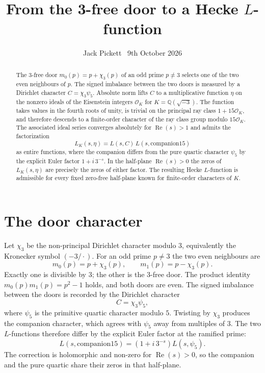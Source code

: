\documentclass[11pt,a4paper]{article}
\title{From the 3-free door to a Hecke $L$-function}
\author{Jack Pickett \textperiodcentered\ 9th October 2026}
\date{}
\begin{document}
\maketitle

\begin{abstract}
The 3-free door \(m_0(p)=p+\chi_3(p)\) of an odd prime \(p\neq 3\) selects one of the two even neighbours of \(p\). The signed imbalance between the two doors is measured by a Dirichlet character \(C=\chi_3\psi_5\). Absolute norm lifts \(C\) to a multiplicative function \(\eta\) on the nonzero ideals of the Eisenstein integers \(\mathcal{O}_K\) for \(K=\mathbb{Q}(\sqrt{-3})\). The function takes values in the fourth roots of unity, is trivial on the principal ray class \(1+15\mathcal{O}_K\), and therefore descends to a finite-order character of the ray class group modulo \(15\mathcal{O}_K\). The associated ideal series converges absolutely for \(\operatorname{Re}(s)>1\) and admits the factorization
\[
L_K(s,\eta)=L(s,C)\,L(s,\mathrm{companion15})
\]
as entire functions, where the companion differs from the pure quartic character \(\psi_5\) by the explicit Euler factor \(1+i\,3^{-s}\). In the half-plane \(\operatorname{Re}(s)>0\) the zeros of \(L_K(s,\eta)\) are precisely the zeros of either factor. The resulting Hecke \(L\)-function is admissible for every fixed zero-free half-plane known for finite-order characters of \(K\).
\end{abstract}

\section{The door character}

Let \(\chi_3\) be the non-principal Dirichlet character modulo \(3\), equivalently the Kronecker symbol \((-3/\cdot)\). For an odd prime \(p\neq 3\) the two even neighbours are
\[
m_0(p)=p+\chi_3(p),\qquad m_1(p)=p-\chi_3(p).
\]
Exactly one is divisible by \(3\); the other is the 3-free door. The product identity \(m_0(p)m_1(p)=p^2-1\) holds, and both doors are even. The signed imbalance between the doors is recorded by the Dirichlet character
\[
C=\chi_3\psi_5,
\]
where \(\psi_5\) is the primitive quartic character modulo \(5\). Twisting by \(\chi_3\) produces the companion character, which agrees with \(\psi_5\) away from multiples of \(3\). The two \(L\)-functions therefore differ by the explicit Euler factor at the ramified prime:
\begin{equation}
\label{eq:correction}
L(s,\mathrm{companion15})=(1+i\,3^{-s})L(s,\psi_5).
\end{equation}
The correction is holomorphic and non-zero for \(\operatorname{Re}(s)>0\), so the companion and the pure quartic share their zeros in that half-plane.
\end{document}
